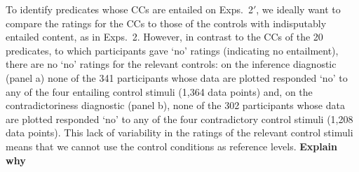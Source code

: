 \documentclass[11pt,fleqn]{article}
\newcommand{\6}{\mbox{$[\hspace*{-.6mm}[$}}
\newcommand{\9}{\mbox{$]\hspace*{-.6mm}]$}}
\begin{document}
{%
%
%
%

To identify predicates whose CCs are entailed on Exps.~2$'$, we ideally want to compare the ratings for the CCs to those of the controls with indisputably entailed content, as in Exps.~2. However, in contrast to the CCs of the 20 predicates, to which participants gave `no' ratings (indicating no entailment), there are no `no' ratings for the relevant controls: on the inference diagnostic (panel a) none of the 341 participants whose data are plotted responded `no' to any of the four entailing control stimuli (1,364 data points) and, on the contradictoriness diagnostic (panel b), none of the 302 participants whose data are plotted responded `no' to any of the four contradictory control stimuli (1,208 data points). This lack of variability in the ratings of the relevant control stimuli means that we cannot use the control conditions as reference levels. {\bf Explain why}

}
\end{document}
